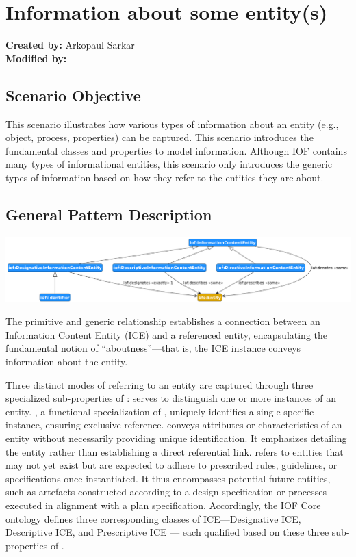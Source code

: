 \section{Information about some entity(s)}
\label{sec-information-about}

\textbf{Created by:} Arkopaul Sarkar \\
\textbf{Modified by:}

\subsection*{Scenario Objective}
This scenario illustrates how various types of information about an entity (e.g., object, process, properties) can be captured. This scenario introduces the fundamental classes and properties to model information. Although IOF contains many types of informational entities, this scenario only introduces the generic types of information based on how they refer to the entities they are about.  

\subsection*{General Pattern Description}

\includegraphics[scale=0.35]{scenarios/information-and-aboutness/images/general-information-aboutness.png}

The primitive and generic relationship  establishes a connection between an Information Content Entity (ICE) and a referenced entity, encapsulating the fundamental notion of ``aboutness''—that is, the ICE instance conveys information about the entity.

Three distinct modes of referring to an entity are captured through three specialized sub-properties of :  serves to distinguish one or more instances of an entity.
, a functional specialization of , uniquely identifies a single specific instance, ensuring exclusive reference.
 conveys attributes or characteristics of an entity without necessarily providing unique identification. It emphasizes detailing the entity rather than establishing a direct referential link.
 refers to entities that may not yet exist but are expected to adhere to prescribed rules, guidelines, or specifications once instantiated. It thus encompasses potential future entities, such as artefacts constructed according to a design specification or processes executed in alignment with a plan specification.
Accordingly, the IOF Core ontology defines three corresponding classes of ICE—Designative ICE, Descriptive ICE, and Prescriptive ICE — each qualified based on these three sub-properties of . 

